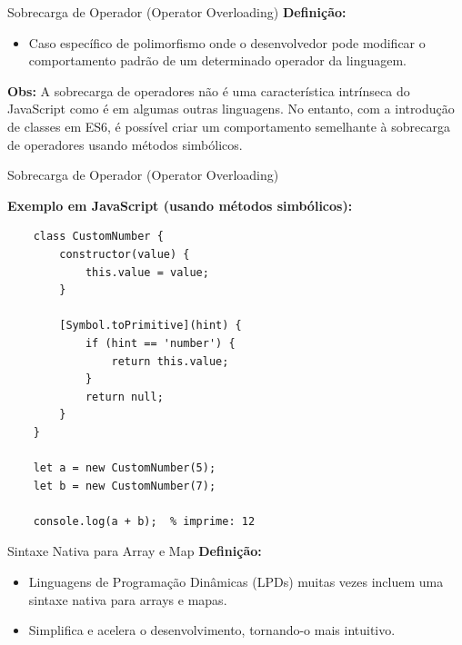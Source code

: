 \documentclass{beamer}
\begin{document}
\begin{frame}[fragile]{Sobrecarga de Operador (Operator Overloading)}\justifying
	\textbf{Definição:}
	\begin{itemize}
		\item Caso específico de polimorfismo onde o desenvolvedor pode modificar o comportamento padrão de um determinado operador da linguagem.
	\end{itemize}
	\textbf{Obs:}
	A sobrecarga de operadores não é uma característica intrínseca do JavaScript como é em algumas outras linguagens. No entanto, com a introdução de classes em ES6, é possível criar um comportamento semelhante à sobrecarga de operadores usando métodos simbólicos.


\end{frame}
\begin{frame}[fragile]{Sobrecarga de Operador (Operator Overloading)}

	\textbf{Exemplo em JavaScript (usando métodos simbólicos):}
	\begin{verbatim}
    class CustomNumber {
        constructor(value) {
            this.value = value;
        }
    
        [Symbol.toPrimitive](hint) {
            if (hint == 'number') {
                return this.value;
            }
            return null;
        }
    }
    
    let a = new CustomNumber(5);
    let b = new CustomNumber(7);
    
    console.log(a + b);  % imprime: 12
      \end{verbatim}
\end{frame}

\begin{frame}[fragile]{Sintaxe Nativa para Array e Map}
	\textbf{Definição:}
	\begin{itemize}
		\item Linguagens de Programação Dinâmicas (LPDs) muitas vezes incluem uma sintaxe nativa para arrays e mapas.
		\item Simplifica e acelera o desenvolvimento, tornando-o mais intuitivo.
	\end{itemize}


\end{frame}
\end{document}
